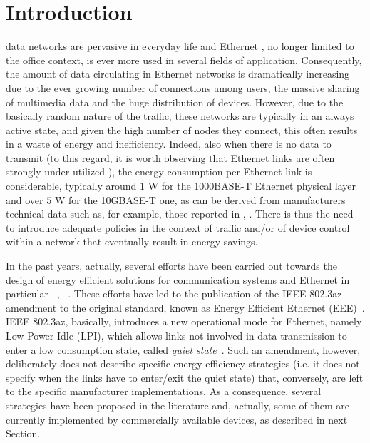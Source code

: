 \documentclass[journal,10pt,twoside,final]{IEEEtran}
\begin{document}
\section{Introduction}
\label{intro}
 data networks are pervasive in everyday life and Ethernet \cite{ether}, no longer limited to the office context, is ever more used in several fields of application. Consequently, the amount of data circulating in Ethernet networks is dramatically increasing due to the ever growing number of connections among users, the massive sharing of multimedia data and the huge distribution of devices.
However, due to the basically random nature of the traffic, these networks are typically in an always active state, and given the high number of nodes they connect, this often results in a waste of energy and inefficiency. Indeed, also when there is no data to transmit (to this regard, it is worth observing that Ethernet links are often strongly under-utilized \cite{bolla_jsac}), the energy consumption per Ethernet link is considerable, typically around $1$ W for the 1000BASE-T Ethernet physical layer and over $5$ W for the 10GBASE-T one, as can be derived from manufacturers technical data such as, for example, those reported in \cite{cisco}, \cite{intel}. There is thus the need to introduce adequate policies in the context of traffic and/or of device control within a network that eventually result in energy savings.

In the past years, actually, several efforts have been carried out towards the design of energy efficient solutions for communication systems and Ethernet in particular ~\cite{GuptaSingh03}, ~\cite{GunaratneChristensenNordman08}.
These efforts have led to the publication of the IEEE 802.3az amendment to the original standard, known as Energy Efficient Ethernet (EEE)~\cite{eee}. IEEE 802.3az, basically, introduces a new operational mode for Ethernet, namely Low Power Idle (LPI), which allows links not involved in data transmission to enter a low consumption state, called \emph{quiet state}~\cite{ChristensenReviriegoNordman10}. Such an amendment, however, deliberately does not describe specific energy efficiency strategies (i.e. it does not specify when the links have to enter/exit the quiet state) that, conversely, are left to the specific manufacturer implementations. As a consequence, several strategies have been proposed in the literature and, actually, some of them are currently implemented by commercially available devices, as described in next Section. 
\end{document}

